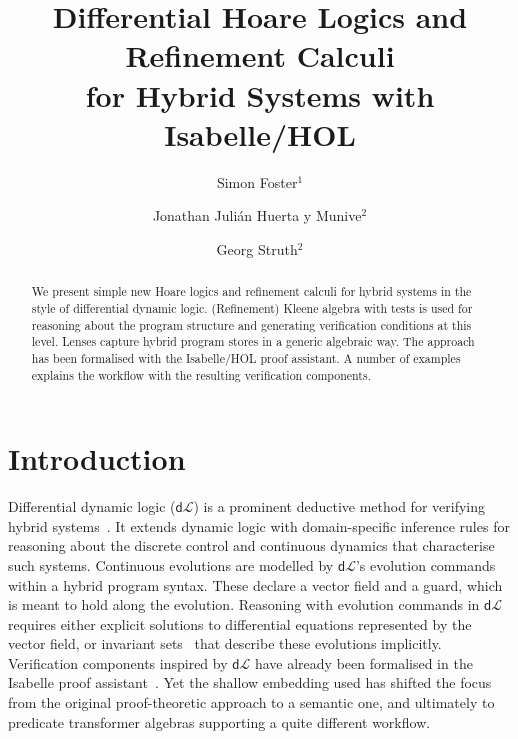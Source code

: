 \documentclass[envcountsame,envcountsect]{llncs}
\newcommand{\dL}{\mathsf{d}\mathcal{L}}
\begin{document}
\title{Differential Hoare Logics and Refinement Calculi\\ for Hybrid Systems with Isabelle/HOL}


\author{Simon Foster$^1$ \and Jonathan Juli\'an Huerta y Munive$^2$ \and Georg Struth$^2$} 


\maketitle

\begin{abstract} 
  We present simple new Hoare logics and refinement calculi for hybrid
  systems in the style of differential dynamic logic. (Refinement)
  Kleene algebra with tests is used for reasoning about the program
  structure and generating verification conditions at this level.
  Lenses capture hybrid program stores in a generic algebraic way. The
  approach has been formalised with the Isabelle/HOL proof
  assistant. A number of examples explains the workflow with the
  resulting verification components.
\end{abstract}



\section{Introduction}\label{sec:introduction}

Differential dynamic logic ($\dL$) is a prominent deductive method for
verifying hybrid systems~\cite{Platzer18}. It extends dynamic logic
with domain-specific inference rules for reasoning about the discrete
control and continuous dynamics that characterise such
systems. Continuous evolutions are modelled by $\dL$'s evolution
commands within a hybrid program syntax. These declare a vector field
and a guard, which is meant to hold along the evolution.  Reasoning
with evolution commands in $\dL$ requires either explicit solutions to
differential equations represented by the vector field, or invariant
sets~\cite{Teschl12} that describe these evolutions implicitly. Verification
components inspired by $\dL$ have already been formalised in the
Isabelle proof assistant~\cite{MuniveS19}. Yet the shallow embedding
used has shifted the focus from the original proof-theoretic approach
to a semantic one, and ultimately to predicate transformer algebras
supporting a quite different workflow.
\end{document}
